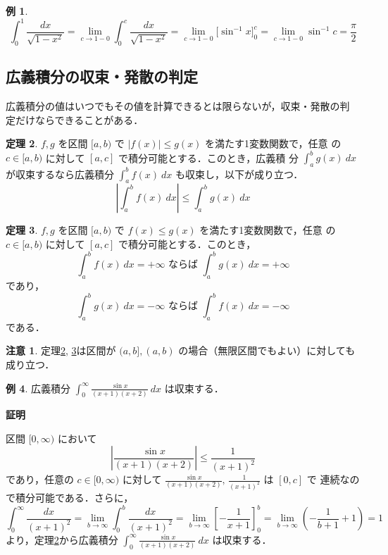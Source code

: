 \documentclass[10pt, uplatex, dvipdfmx]{jsarticle}
\makeatletter
\renewenvironment{proof}[1][\proofname]{\par
  \pushQED{\qed}%
  \normalfont \topsep6\p@\@plus6\p@\relax
  \trivlist
  \item\relax
  {\bfseries
  #1\@addpunct{.}}\hspace\labelsep\ignorespaces
}{%
  \popQED\endtrivlist\@endpefalse
}
\theoremstyle{definition}
\newtheorem{theorem}{定理}[section]
\newtheorem{example}[theorem]{例}
\newtheorem*{remark}{注意}
\renewcommand{\proofname}{\textbf{証明}}
\numberwithin{equation}{section}
\newcommand{\ds}{\displaystyle}
\makeatother
\begin{document}
\begin{example}
  \[
    \int_{0}^{1} \frac{dx}{\sqrt{1-x^2}} = \lim_{c \to 1-0}  \int_{0}^{c} \frac{dx}{\sqrt{1-x^2}}
    = \lim_{c \to 1-0} \Big[ \sin^{-1} x \Big]_{0}^{c} = \lim_{c \to 1-0} \sin^{-1}c 
    = \frac{\pi}{2}
  \]
\end{example}


\subsection{広義積分の収束・発散の判定}

広義積分の値はいつでもその値を計算できるとは限らないが，収束・発散の判
定だけならできることがある．

\begin{theorem}\label{thm:convergent}
  $f,g$ を区間 $[a, b)$ で $|f(x)| \leq g(x)$ を満たす1変数関数で，任意
  の $c \in [a,b)$ に対して $[a,c]$ で積分可能とする．このとき，広義積
  分 $\ds \int_{a}^{b} g(x)\ dx$ が収束するなら広義積分 $\ds \int_{a}^{b}
  f(x) \ dx$ も収束し，以下が成り立つ．
  \[
    \left| \int_{a}^{b} f(x)\ dx \right| \leq \int_{a}^{b} g(x)\ dx
  \]
\end{theorem}

\begin{theorem}\label{thm:divergent}
  $f,g$ を区間 $[a,b)$ で $f(x) \leq g(x)$ を満たす1変数関数で，任意
  の $c \in [a,b)$ に対して $[a,c]$ で積分可能とする．このとき，
  \[
    \int_{a}^{b} f(x) \ dx = +\infty \text{ ならば } \int_{a}^{b} g(x) \ dx = +\infty
  \]
  であり，
  \[
    \int_{a}^{b} g(x)\ dx = -\infty \text{ ならば } \int_{a}^{b} f(x)\ dx = -\infty
  \]
  である．
  \end{theorem}

\begin{remark}
  定理\ref{thm:convergent}, \ref{thm:divergent}は区間が $(a,b], (a,b)$
  の場合（無限区間でもよい）に対しても成り立つ．
\end{remark}


\begin{example}
  広義積分 $\ds \int_{0}^{\infty} \frac{\sin x}{(x+1)(x+2)}\ dx$ は収束する．
  
  \begin{proof}
    区間 $[0, \infty)$ において
    \[
      \left|\frac{\sin x}{(x+1)(x+2)}\right| \leq \frac{1}{(x+1)^2}
    \]
    であり，任意の $c \in [0, \infty)$ に対して
    $\ds \frac{\sin x}{(x+1)(x+2)}, \, \frac{1}{(x+1)^2}$ は $[0,c]$ で
    連続なので積分可能である．さらに，
    \[
      \int_{0}^{\infty} \frac{dx}{(x+1)^2} = \lim_{b \to \infty} \int_{0}^{b} \frac{dx}{(x+1)^2}
      = \lim_{b \to \infty} \left[ -\frac{1}{x+1}\right]_{0}^{b}
      =\lim_{b \to \infty}\left( -\frac{1}{b+1} +1\right) =1
    \]
    より，定理\ref{thm:convergent}から広義積分
    $\ds \int_{0}^{\infty}\frac{\sin x}{(x+1)(x+2)}\ dx$ は収束する．
  \end{proof}
\end{example}
\end{document}
